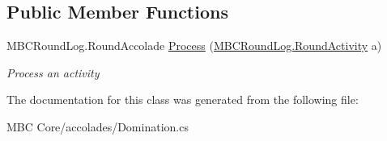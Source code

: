 \subsection*{Public Member Functions}
\begin{DoxyCompactItemize}
\item 
\hypertarget{class_m_b_c_core_1_1mbc_1_1accolades_1_1_domination_a3abff22bcf103165e49d4df08482c661}{M\-B\-C\-Round\-Log.\-Round\-Accolade \hyperlink{class_m_b_c_core_1_1mbc_1_1accolades_1_1_domination_a3abff22bcf103165e49d4df08482c661}{Process} (\hyperlink{class_m_b_c_core_1_1_m_b_c_round_log_1_1_round_activity}{M\-B\-C\-Round\-Log.\-Round\-Activity} a)}\label{class_m_b_c_core_1_1mbc_1_1accolades_1_1_domination_a3abff22bcf103165e49d4df08482c661}

\begin{DoxyCompactList}\small\item\em Process an activity\end{DoxyCompactList}\end{DoxyCompactItemize}


The documentation for this class was generated from the following file\-:\begin{DoxyCompactItemize}
\item 
M\-B\-C Core/accolades/Domination.\-cs\end{DoxyCompactItemize}
